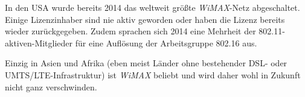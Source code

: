 \begin{multicols}{3}
In den USA wurde bereits 2014 das weltweit größte \textit{WiMAX}-Netz abgeschaltet. Einige Lizenzinhaber sind nie aktiv geworden oder haben die Lizenz bereits wieder zurückgegeben. Zudem sprachen sich 2014 eine Mehrheit der 802.11-aktiven-Mitglieder für eine Auflösung der Arbeitsgruppe 802.16 aus.

Einzig in Asien und Afrika (eben meist Länder ohne bestehender DSL- oder UMTS/LTE-Infrastruktur) ist \textit{WiMAX} beliebt und wird daher wohl in Zukunft nicht ganz verschwinden.~\cite{wmx.3}


\printbibliography[segment=21,heading=subbibliography]
\end{multicols}

\newpage
